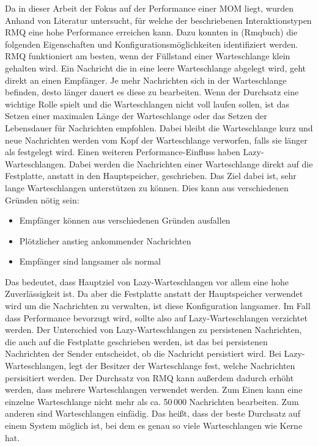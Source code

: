 Da in dieser Arbeit der Fokus auf der Performance einer MOM liegt, wurden Anhand von Literatur untersucht, für welche der beschriebenen Interaktionstypen RMQ eine hohe Performance erreichen kann. Dazu konnten in (Rmqbuch) die folgenden Eigenschaften und Konfigurationsmöglichkeiten identifiziert werden. RMQ funktioniert am besten, wenn der Füllstand einer Warteschlange klein gehalten wird. Ein Nachricht die in eine leere Warteschlange abgelegt wird, geht direkt an einen Empfänger. Je mehr Nachrichten sich in der Warteschlange befinden, desto länger dauert es diese zu bearbeiten. Wenn der Durchsatz eine wichtige Rolle spielt und die Warteschlangen nicht voll laufen sollen, ist das Setzen einer maximalen Länge der Warteschlange oder das Setzen der Lebensdauer für Nachrichten empfohlen. Dabei bleibt die Warteschlange kurz und neue Nachrichten werden vom Kopf der Warteschlange verworfen, falls sie länger als festgelegt wird. Einen weiteren Performance-Einfluss haben Lazy-Warteschlangen. Dabei werden die Nachrichten einer Warteschlange direkt auf die Festplatte, anstatt in den Hauptspeicher, geschrieben. Das Ziel dabei ist, sehr lange Warteschlangen unterstützen zu können. Dies kann aus verschiedenen Gründen nötig sein:
\begin{itemize}
    \item Empfänger können aus verschiedenen Gründen ausfallen
    \item Plötzlicher anstieg ankommender Nachrichten
    \item Empfänger sind langsamer als normal
\end{itemize}
Das bedeutet, dass Hauptziel von Lazy-Warteschlangen vor allem eine hohe Zuverlässigkeit ist. Da aber die Festplatte anstatt der Hauptspeicher verwendet wird um die Nachrichten zu verwalten, ist diese Konfiguration langsamer. Im Fall dass Performance bevorzugt wird, sollte also auf Lazy-Warteschlangen verzichtet werden. Der Unterschied von Lazy-Warteschlangen zu persistenen Nachrichten, die auch auf die Festplatte geschrieben werden, ist das bei persistenen Nachrichten der Sender entscheidet, ob die Nachricht persistiert wird. Bei Lazy-Warteschlangen, legt der Besitzer der Warteschlange fest, welche Nachrichten persisitiert werden. Der Durchsatz von RMQ kann außerdem dadurch erhöht werden, dass mehrere Warteschlangen verwendet werden. Zum Einen kann eine einzelne Warteschlange nicht mehr als ca. 50\,000 Nachrichten bearbeiten. Zum anderen sind Warteschlangen einfädig. Das heißt, dass der beste Durchsatz auf einem System möglich ist, bei dem es genau so viele Warteschlangen wie Kerne hat. 

